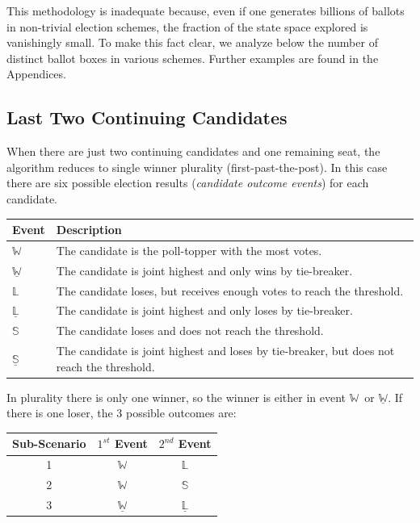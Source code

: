 \documentclass[runningheads,a4paper]{llncs}
\newcommand{\winner}{\ensuremath{\mathbb{W}}}
\newcommand{\loser}{\ensuremath{\mathbb{L}}}
\newcommand{\belowthreshold}{\ensuremath{\mathbb{S}}}
\newcommand{\tiebreak}[1]{\ensuremath{\underline{#1}}}
\newcommand{\first}{$1^{st}$\xspace}
\newcommand{\second}{$2^{nd}$\xspace}
\begin{document}
This methodology is inadequate because, even if one generates
billions of ballots in non-trivial election schemes, the fraction of
the state space explored is vanishingly small.  To make this fact
clear, we analyze below the number of distinct ballot boxes in various
schemes.  Further examples are found in the Appendices.

\subsection{Last Two Continuing Candidates}
\label{subsec:plurality}

When there are just two continuing candidates and one remaining seat,
the algorithm reduces to single winner plurality
(first-past-the-post).  In this case there are six possible election
results (\emph{candidate outcome events}) for each candidate.

\begin{center}
  \begin{longtable}{l|p{}}
    Event & Description \\ 
    \hline
    \winner & The candidate is the poll-topper with the most votes. \\
    \tiebreak{\winner} & The candidate is joint highest and only wins by
    tie-breaker. \\
    \loser & The candidate loses, but receives enough votes to reach the
    threshold. \\
    \tiebreak{\loser} & The candidate is joint highest and only loses by
    tie-breaker. \\
    \belowthreshold & The candidate loses and does not reach the threshold. \\
    \tiebreak{\belowthreshold} & The candidate is joint highest and loses by
    tie-breaker, but does not reach the threshold.
  \end{longtable}
\end{center}

In plurality there is only one winner, so the winner is either in
event \winner\ or \tiebreak{\winner}.  If there is one loser, the 3
possible outcomes are:
\begin{center}
  \begin{longtable}{c|c|c}
    Sub-Scenario & \first Event & \second Event\\ 
    \hline
    1 & \winner & \loser \\
    2 & \winner & \belowthreshold \\
    3 & \tiebreak{\winner} & \tiebreak{\loser}
  \end{longtable}
\end{center}
\end{document}
